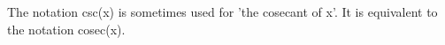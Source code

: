 The notation csc(x) is sometimes used for 'the cosecant of x'. It is
equivalent to the notation cosec(x).